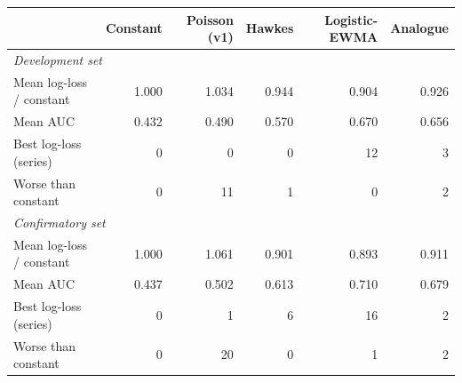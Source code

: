 \begin{tabular}{lrrrrr}
\toprule
& Constant & Poisson (v1) & Hawkes & Logistic-EWMA & Analogue \\
\midrule
\multicolumn{6}{l}{\textit{Development set}}\\
Mean log-loss / constant & 1.000 & 1.034 & 0.944 & 0.904 & 0.926\\
Mean AUC & 0.432 & 0.490 & 0.570 & 0.670 & 0.656\\
Best log-loss (series) & 0 & 0 & 0 & 12 & 3\\
Worse than constant & 0 & 11 & 1 & 0 & 2\\
\midrule
\multicolumn{6}{l}{\textit{Confirmatory set}}\\
Mean log-loss / constant & 1.000 & 1.061 & 0.901 & 0.893 & 0.911\\
Mean AUC & 0.437 & 0.502 & 0.613 & 0.710 & 0.679\\
Best log-loss (series) & 0 & 1 & 6 & 16 & 2\\
Worse than constant & 0 & 20 & 0 & 1 & 2\\
\bottomrule
\end{tabular}
